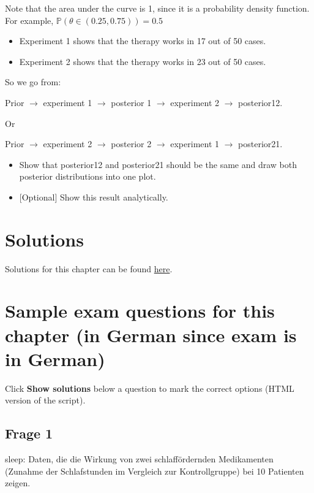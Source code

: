 \documentclass[
]{book}
\providecommand{\tightlist}{%
  \setlength{\itemsep}{0pt}\setlength{\parskip}{0pt}}
\begin{document}
Note that the area under the curve is 1, since it is a probability density function.
For example, \(\mathbb{P}(\theta \in (0.25,0.75)) = 0.5\)

\begin{itemize}
\tightlist
\item
  Experiment 1 shows that the therapy works in 17 out of 50 cases.
\item
  Experiment 2 shows that the therapy works in 23 out of 50 cases.
\end{itemize}

So we go from:

Prior \(\rightarrow\) experiment 1 \(\rightarrow\) posterior 1 \(\rightarrow\) experiment 2 \(\rightarrow\) posterior12.

Or

Prior \(\rightarrow\) experiment 2 \(\rightarrow\) posterior 2 \(\rightarrow\) experiment 1 \(\rightarrow\) posterior21.

\begin{itemize}
\item
  Show that posterior12 and posterior21 should be the same and draw both posterior distributions into one plot.
\item
  {[}Optional{]} Show this result analytically.
\end{itemize}

\section{Solutions}\label{solutions-2}

Solutions for this chapter can be found \href{https://github.com/jdegenfellner/Script_QM1_ZHAW/tree/main/Solutions_to_Exercises/4_Bayes_Statistics}{here}.

\section{Sample exam questions for this chapter (in German since exam is in German)}\label{sample-exam-questions-for-this-chapter-in-german-since-exam-is-in-german-2}

Click \textbf{Show solutions} below a question to mark the correct options (HTML version of the script).

\subsection{Frage 1}\label{frage-1}

sleep: Daten, die die Wirkung von zwei schlaffördernden Medikamenten
(Zunahme der Schlafstunden im Vergleich zur Kontrollgruppe) bei 10 Patienten zeigen.
\end{document}
